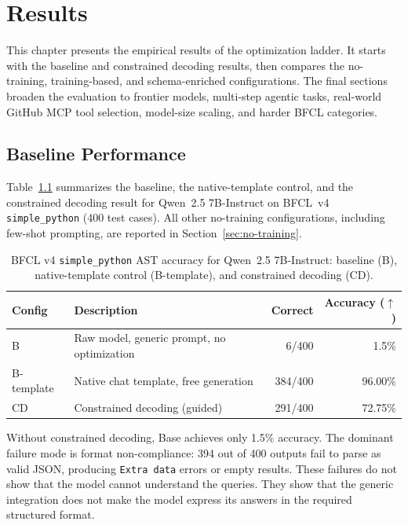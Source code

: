 \chapter{Results} \label{ch:results}

This chapter presents the empirical results of the optimization ladder. It
starts with the baseline and constrained decoding results, then compares the
no-training, training-based, and schema-enriched configurations. The final
sections broaden the evaluation to frontier models, multi-step agentic tasks,
real-world GitHub MCP tool selection, model-size scaling, and harder BFCL
categories.

\section{Baseline Performance}
\label{sec:baseline}

Table~\ref{tab:baseline-results} summarizes the baseline, the native-template
control, and the constrained decoding result for Qwen~2.5 7B-Instruct on
BFCL~v4 \texttt{simple\_python} (400 test cases). All other no-training
configurations, including few-shot prompting, are reported in
Section~\ref{sec:no-training}.

\begin{table}[ht]
\centering
\caption{BFCL v4 \texttt{simple\_python} AST accuracy for Qwen~2.5 7B-Instruct:
         baseline (B), native-template control (B-template), and constrained
         decoding (CD).}
\label{tab:baseline-results}
\begin{tabular}{llrr}
\toprule
Config & Description & Correct & Accuracy ($\uparrow$) \\
\midrule
B          & Raw model, generic prompt, no optimization & 6/400   & 1.5\% \\
B-template & Native chat template, free generation      & 384/400 & 96.00\% \\
\midrule
CD         & Constrained decoding (guided)              & 291/400 & 72.75\% \\
\bottomrule
\end{tabular}
\end{table}

\noindent Without constrained decoding, Base achieves only 1.5\% accuracy. The
dominant failure mode is format non-compliance: 394 out of 400 outputs fail to
parse as valid JSON, producing \texttt{Extra data} errors or empty results.
These failures do not show that the model cannot understand the queries. They
show that the generic integration does not make the model express its answers
in the required structured format.

